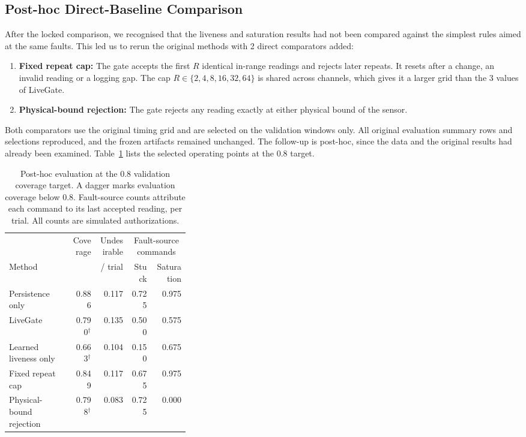 \subsection{Post-hoc Direct-Baseline Comparison}

After the locked comparison, we recognised that the liveness and saturation results had not been compared against the simplest rules aimed at the same faults. This led us to rerun the original methods with 2 direct comparators added:
\begin{enumerate}
\item \textbf{Fixed repeat cap:} The gate accepts the first $R$ identical in-range readings and rejects later repeats. It resets after a change, an invalid reading or a logging gap. The cap $R\in\{2,4,8,16,32,64\}$ is shared across channels, which gives it a larger grid than the 3 values of LiveGate.
\item \textbf{Physical-bound rejection:} The gate rejects any reading exactly at either physical bound of the sensor.
\end{enumerate}
Both comparators use the original timing grid and are selected on the validation windows only. All original evaluation summary rows and selections reproduced, and the frozen artifacts remained unchanged. The follow-up is post-hoc, since the data and the original results had already been examined. Table~\ref{tab:followup} lists the selected operating points at the 0.8 target.

\begin{table}[!htbp]\centering\small\setlength{\tabcolsep}{4pt}

\caption{Post-hoc evaluation at the 0.8 validation coverage target. A dagger marks evaluation coverage below 0.8. Fault-source counts attribute each command to its last accepted reading, per trial. All counts are simulated authorizations.}

\label{tab:followup}

\begin{tabular}{p{0.35\linewidth}rrrr}\toprule

& Coverage & Undesirable & \multicolumn{2}{c}{Fault-source commands}\\

Method & & / trial & Stuck & Saturation\\\midrule

Persistence only & 0.886 & 0.117 & 0.725 & 0.975\\

LiveGate & 0.790$^{\dagger}$ & 0.135 & 0.500 & 0.575\\

Learned liveness only & 0.663$^{\dagger}$ & 0.104 & 0.150 & 0.675\\

Fixed repeat cap & 0.849 & 0.117 & 0.675 & 0.975\\

Physical-bound rejection & 0.798$^{\dagger}$ & 0.083 & 0.725 & 0.000\\

\bottomrule\end{tabular}\end{table}

